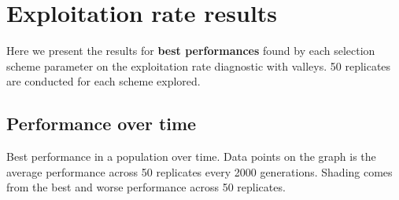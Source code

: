 \documentclass[]{book}
\newenvironment{Shaded}{\begin{snugshade}}{\end{snugshade}}
\newcommand{\DataTypeTok}[1]{\textcolor[rgb]{0.13,0.29,0.53}{#1}}
\newcommand{\KeywordTok}[1]{\textcolor[rgb]{0.13,0.29,0.53}{\textbf{#1}}}
\newcommand{\NormalTok}[1]{#1}
\newcommand{\OperatorTok}[1]{\textcolor[rgb]{0.81,0.36,0.00}{\textbf{#1}}}
\newcommand{\OtherTok}[1]{\textcolor[rgb]{0.56,0.35,0.01}{#1}}
\newcommand{\StringTok}[1]{\textcolor[rgb]{0.31,0.60,0.02}{#1}}
\begin{document}
\begin{Shaded}
\end{Shaded}

\hypertarget{exploitation-rate-results}{%
\section{Exploitation rate results}\label{exploitation-rate-results}}

Here we present the results for \textbf{best performances} found by each selection scheme parameter on the exploitation rate diagnostic with valleys.
50 replicates are conducted for each scheme explored.

\hypertarget{performance-over-time}{%
\subsection{Performance over time}\label{performance-over-time}}

Best performance in a population over time.
Data points on the graph is the average performance across 50 replicates every 2000 generations.
Shading comes from the best and worse performance across 50 replicates.
\end{document}

